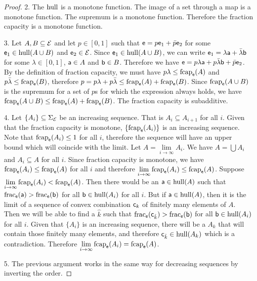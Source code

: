 \begin{mathSection}
\begin{proof}
		2. The $\hull$ is a monotone function. The image of a set through a map is a monotone function. The supremum is a monotone function. Therefore the fraction capacity is a monotone function.
		
		3. Let $A, B \subseteq \Ens$ and let $p \in [0,1]$ such that $\ens = p \ens_1 + \bar{p} \ens_2$ for some $\ens_1 \in \hull(A \cup B)$ and $\ens_2 \in \Ens$. Since $\ens_1 \in \hull(A \cup B)$, we can write $\ens_1 = \lambda \ens[a] + \bar{\lambda} \ens[b]$ for some $\lambda \in [0,1]$, $\ens[a] \in A$ and $\ens[b] \in B$. Therefore we have $\ens = p \lambda \ens[a] + p \bar{\lambda} \ens[b] + \bar{p} \ens_2$. By the definition of fraction capacity, we must have $p\lambda \leq \fcap_{\ens}(A)$ and $p\bar{\lambda} \leq \fcap_{\ens}(B)$, therefore $p = p\lambda + p\bar{\lambda} \leq \fcap_{\ens}(A) + \fcap_{\ens}(B)$. 	Since $\fcap_{\ens}(A \cup B)$ is the supremum for a set of $p$s for which the expression always holds, we have $\fcap_{\ens}(A \cup B) \leq \fcap_{\ens}(A) + \fcap_{\ens}(B)$. The fraction capacity is subadditive.
		
		4. Let $\{A_i\} \subseteq \Sigma_{\Ens}$ be an increasing sequence. That is $A_i \subseteq A_{i+1}$ for all $i$. Given that the fraction capacity is monotone, $\{\fcap_{\ens}(A_i)\}$ is an increasing sequence. Note that $\fcap_{\ens}(A_i) \leq 1$ for all $i$, therefore the sequence will have an upper bound which will coincide with the limit. Let $A = \lim\limits_{i \to \infty} A_i$. We have $A = \bigcup A_i$ and $A_i \subseteq A$ for all $i$. Since fraction capacity is monotone, we have $\fcap_{\ens}(A_i) \leq \fcap_{\ens}(A)$ for all $i$ and therefore $\lim\limits_{i \to \infty} \fcap_{\ens}(A_i) \leq \fcap_{\ens}(A)$. Suppose $\lim\limits_{i \to \infty} \fcap_{\ens}(A_i) < \fcap_{\ens}(A)$. Then there would be an $\ens[a] \in \hull(A)$ such that $\size_{\ens}(\ens[a]) > \size_{\ens}(\ens[b])$ for all $\ens[b] \in \hull(A_i)$ for all $i$. But if $\ens[a] \in \hull(A)$, then it is the limit of a sequence of convex combination $\ens[c]_k$ of finitely many elements of $A$. Then we will be able to find a $\hat{k}$ such that $\size_{\ens}(\ens[c]_{\hat{k}}) > \size_{\ens}(\ens[b])$ for all $\ens[b] \in \hull(A_i)$ for all $i$. Given that $\{A_i\}$ is an increasing sequence, there will be a $A_k$ that will contain those finitely many elements, and therefore $\ens[c]_{\hat{k}} \in \hull(A_k)$ which is a contradiction. Therefore $\lim\limits_{i \to \infty} \fcap_{\ens}(A_i) = \fcap_{\ens}(A)$.
		
		5. The previous argument works in the same way for decreasing sequences by inverting the order.
	\end{proof}
\end{mathSection}


